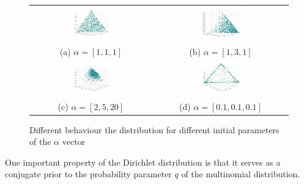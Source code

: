 \documentclass [twoside,hidelinks]{article}
\begin{document}
    \begin{figure} [!h]
        \begin{tabular}{cc}
       	          \includegraphics [width=0.35\textwidth]{uniformDist} & \includegraphics [width=0.35\textwidth]{1-3-1Ddist} \\
    		 (a) $ \alpha =  [1,1,1] $ &  (b) $ \alpha =  [1,3,1] $  \\ [6pt]
    		 \includegraphics [width=0.35\textwidth]{2-5-20Dist} &    \includegraphics [width=0.35\textwidth]{01-01-01Dist} \\
    		 (c) $ \alpha =  [2,5,20] $  &  (d) $ \alpha =  [0.1,0.1,0.1] $  \\ [6pt]
    	\end{tabular}
    	\caption{Different behaviour the distribution for different initial parameters of the $\alpha$ vector}
    	\label{firstplot}
     \end{figure}

One important property of the Dirichlet distribution is that it serves as a conjugate prior to the probability parameter $q$ of the multinomial distribution. 
\end{document}
